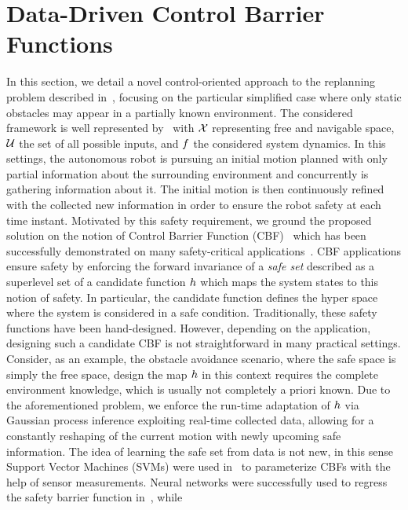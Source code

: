 \section{Data-Driven Control Barrier Functions}
In this section, we detail a novel control-oriented approach to the replanning problem described in~,
focusing on the particular simplified case where only static obstacles may appear in a partially known environment.
The considered framework is well represented by~ with $\mathcal{X}$ representing free and navigable
space, $\mathcal{U}$ the set of all possible inputs, and $f$ the considered system dynamics.
In this settings, the autonomous robot is pursuing an initial motion planned with only partial information about the surrounding
environment and concurrently is gathering information about it. The initial motion is then continuously refined with the collected
new information in order to ensure the robot safety at each time instant.
Motivated by this safety requirement, we ground the proposed solution on the notion of Control Barrier Function (CBF)~\cite{ames2016control}
which has been successfully demonstrated on many safety-critical applications~\cite{ames2016control, wang2017safe, hsu2015control}.
CBF applications ensure safety by enforcing the forward invariance of a \emph{safe set} described as a superlevel set of a candidate
function $h$ which maps the system states to this notion of safety. In particular, the candidate function defines the hyper space
where the system is considered in a safe condition. Traditionally, these safety functions have been hand-designed. However,
depending on the application, designing such a candidate CBF is not straightforward in many practical settings. Consider, as an example,
the obstacle avoidance scenario, where the safe space is simply the free space, design the map $h$ in this context requires
the complete environment knowledge, which is usually not completely a priori known.
Due to the aforementioned problem, we enforce the run-time adaptation of $h$ via Gaussian process inference
exploiting real-time collected data, allowing for a constantly reshaping of the current motion with newly upcoming safe information.
The idea of learning the safe set from data is not new, in this sense Support Vector Machines (SVMs) were used in~\cite{srinivasan2020synthesis}
to parameterize CBFs with the help of sensor measurements. Neural networks were successfully used to regress the 
safety barrier function in~\cite{abate2020formal, zhao2020synthesizing, tsukamoto2020neural, gaby2021lyapunov}, while
